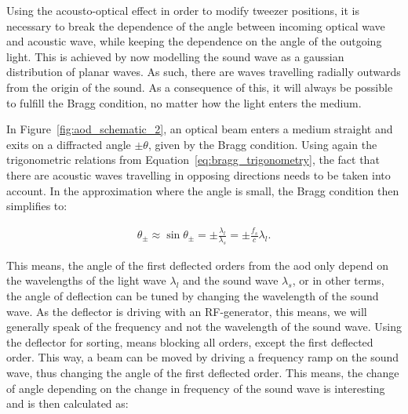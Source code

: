 
Using the acousto-optical effect in order to modify tweezer positions, it is necessary to break the dependence of the angle between incoming optical wave and acoustic wave, while keeping the dependence on the angle of the outgoing light. This is achieved by now modelling the sound wave as a gaussian distribution of planar waves. As such, there are waves travelling radially outwards from the origin of the sound. As a consequence of this, it will always be possible to fulfill the Bragg condition, no matter how the light enters the medium.

In Figure~\ref{fig:aod_schematic_2}, an optical beam enters a medium straight and exits on a diffracted angle $\pm \theta$, given by the Bragg condition. Using again the trigonometric relations from Equation~\ref{eq:bragg_trigonometry}, the fact that there are acoustic waves travelling in opposing directions needs to be taken into account. In the approximation where the angle is small, the Bragg condition then simplifies to:

\begin{figure}[t]
\end{figure}

\begin{align}
	\theta_\pm \approx \sin \theta_\pm = \pm \frac{\lambda_l}{\lambda_s} = \pm \frac{f_s}{c} \lambda_l.
\end{align}

This means, the angle of the first deflected orders from the \ac{aod} only depend on the wavelengths of the light wave $\lambda_l$ and the sound wave $\lambda_s$, or in other terms, the angle of deflection can be tuned by changing the wavelength of the sound wave. As the deflector is driving with an RF-generator, this means, we will generally speak of the frequency and not the wavelength of the sound wave. Using the deflector for sorting, means blocking all orders, except the first deflected order.
This way, a beam can be moved by driving a frequency ramp on the sound wave, thus changing the angle of the first deflected order. This means, the change of angle depending on the change in frequency of the sound wave is interesting and is then calculated as:

